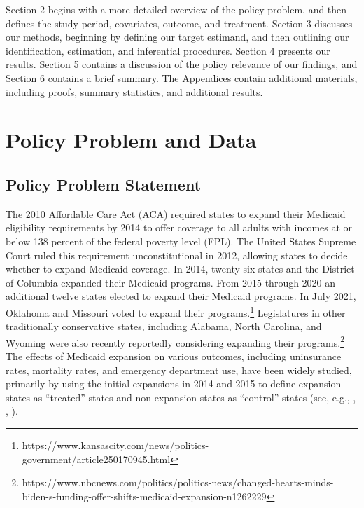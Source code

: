 \documentclass[aoas]{imsart}
\theoremstyle{plain}
\theoremstyle{remark}
\begin{document}
Section 2 begins with a more detailed overview of the policy problem, and then defines the study period, covariates, outcome, and treatment. Section 3 discusses our methods, beginning by defining our target estimand, and then outlining our identification, estimation, and inferential procedures. Section 4 presents our results. Section 5 contains a discussion of the policy relevance of our findings, and Section 6 contains a brief summary. The Appendices contain additional materials, including proofs, summary statistics, and additional results.

\section{Policy Problem and Data}

\subsection{Policy Problem Statement}

The 2010 Affordable Care Act (ACA) required states to expand their Medicaid eligibility requirements by 2014 to offer coverage to all adults with incomes at or below 138 percent of the federal poverty level (FPL). The United States Supreme Court ruled this requirement unconstitutional in 2012, allowing states to decide whether to expand Medicaid coverage. In 2014, twenty-six states and the District of Columbia expanded their Medicaid programs. From 2015 through 2020 an additional twelve states elected to expand their Medicaid programs. In July 2021, Oklahoma and Missouri voted to expand their programs.\footnote{https://www.kansascity.com/news/politics-government/article250170945.html} Legislatures in other traditionally conservative states, including Alabama, North Carolina, and Wyoming were also recently reportedly considering expanding their programs.\footnote{https://www.nbcnews.com/politics/politics-news/changed-hearts-minds-biden-s-funding-offer-shifts-medicaid-expansion-n1262229} The effects of Medicaid expansion on various outcomes, including uninsurance rates, mortality rates, and emergency department use, have been widely studied, primarily by using the initial expansions in 2014 and 2015 to define expansion states as ``treated'' states and non-expansion states as ``control'' states (see, e.g., \cite{courtemanche2017early}, \cite{wherry2016early}, \cite{ladhania2021effect}).
\end{document}

